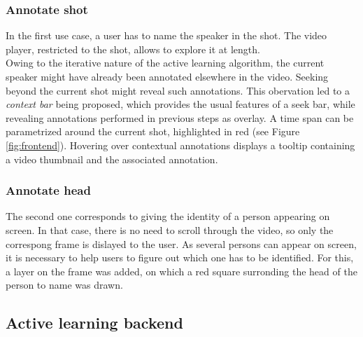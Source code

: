\documentclass[a4paper]{article}
\begin{document}

\subsubsection{Annotate shot} \label{sec:shot}
        \vspace{-0.2cm}
In the first use case, a user has to name the speaker in the shot. The video player, restricted to the shot, allows to explore it at length.\\
Owing to the iterative nature of the active learning algorithm, the current speaker might have already been annotated elsewhere in the video. Seeking beyond the current shot might reveal such annotations. This obervation led to a \emph{context bar} being proposed, which provides the usual features of a seek bar, while revealing annotations performed in previous steps as overlay. A time span can be parametrized around the current shot, highlighted in red (see Figure \ref{fig:frontend}). Hovering over contextual annotations displays a tooltip containing a video thumbnail and the associated annotation.\\

        \vspace{-0.5cm}
\subsubsection{Annotate head} \label{sec:head}
        \vspace{-0.2cm}
The second one corresponds to giving the identity of a person appearing on screen. In that case, there is no need to scroll through the video, so only the correspong frame is dislayed to the user. As several persons can appear on screen, it is necessary to help users to figure out which one has to be identified. For this, a layer on the frame was added, on which a red square surronding the head of the person to name was drawn.\\


        \vspace{-0.5cm}
      \subsection{Active learning backend}
        \vspace{-0.1cm}
\end{document}
